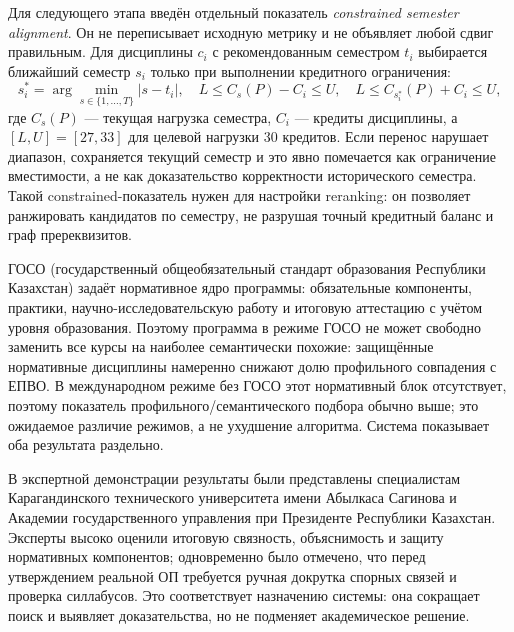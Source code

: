 \documentclass[twoside,11pt]{article}
\begin{document}
Для следующего этапа введён отдельный показатель \emph{constrained semester alignment}. Он не переписывает исходную метрику и не объявляет любой сдвиг правильным. Для дисциплины $c_i$ с рекомендованным семестром $t_i$ выбирается ближайший семестр $s_i$ только при выполнении кредитного ограничения:
\begin{equation}
 s_i^*=\arg\min_{s\in\{1,\ldots,T\}} |s-t_i|,
 \quad L\leq C_s(P)-C_i\leq U,
 \quad L\leq C_{s_i^*}(P)+C_i\leq U,
\end{equation}
где $C_s(P)$ --- текущая нагрузка семестра, $C_i$ --- кредиты дисциплины, а $[L,U]=[27,33]$ для целевой нагрузки 30 кредитов. Если перенос нарушает диапазон, сохраняется текущий семестр и это явно помечается как ограничение вместимости, а не как доказательство корректности исторического семестра. Такой constrained-показатель нужен для настройки reranking: он позволяет ранжировать кандидатов по семестру, не разрушая точный кредитный баланс и граф пререквизитов.

ГОСО (государственный общеобязательный стандарт образования Республики Казахстан) задаёт нормативное ядро программы: обязательные компоненты, практики, научно-исследовательскую работу и итоговую аттестацию с учётом уровня образования. Поэтому программа в режиме ГОСО не может свободно заменить все курсы на наиболее семантически похожие: защищённые нормативные дисциплины намеренно снижают долю профильного совпадения с ЕПВО. В международном режиме без ГОСО этот нормативный блок отсутствует, поэтому показатель профильного/семантического подбора обычно выше; это ожидаемое различие режимов, а не ухудшение алгоритма. Система показывает оба результата раздельно.

В экспертной демонстрации результаты были представлены специалистам Карагандинского технического университета имени Абылкаса Сагинова и Академии государственного управления при Президенте Республики Казахстан. Эксперты высоко оценили итоговую связность, объяснимость и защиту нормативных компонентов; одновременно было отмечено, что перед утверждением реальной ОП требуется ручная докрутка спорных связей и проверка силлабусов. Это соответствует назначению системы: она сокращает поиск и выявляет доказательства, но не подменяет академическое решение.
\end{document}
